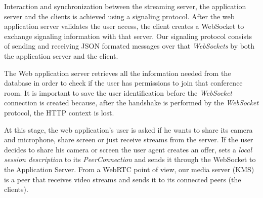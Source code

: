 \documentclass[10pt,conference]{IEEEtran}
\begin{document}
\begin{table}
\centering
	\caption{Application Architecture}
	\label{table:apparch}

\end{table}



Interaction and synchronization between the streaming server, the application server and the clients is achieved using a signaling protocol.
After the web application server validates the user access, the client creates a WebSocket to exchange signaling information with that server. 
Our signaling protocol consists of sending and receiving \gls{JSON} formated messages over that \emph{WebSockets} by both the application server and the client. 

The Web application server retrieves all the information needed from the database in order to check if the user has permissions to join that conference room. 
It is important to save the user identification before the \emph{WebSocket} connection is created because, after the handshake is performed by the \emph{WebSocket} protocol\cite{rfc6455}, the \gls{HTTP} context is lost.

At this stage, the web application's user is asked if he wants to share its camera and microphone, share screen or just receive streams from the server. 
If the user decides to share his camera or screen the user agent creates an offer, sets a \emph{local session description} to its \emph{PeerConnection} and sends it through the WebSocket to the Application Server.
From a \gls{WebRTC} point of view, our media server (\gls{KMS}) is a peer that receives video streams and sends it to its connected peers (the clients). 
\end{document}
